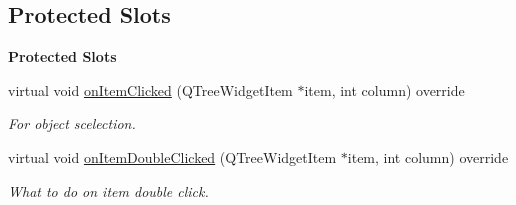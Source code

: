 \subsection*{Protected Slots}
\begin{Indent}\textbf{ Protected Slots}\par
\begin{DoxyCompactItemize}
\item 
\mbox{\label{classrev_1_1_view_1_1_animation_tree_widget_a55c28cf1a2b9fba691f0dd83efe8cff7}} 
virtual void \mbox{\hyperlink{classrev_1_1_view_1_1_animation_tree_widget_a55c28cf1a2b9fba691f0dd83efe8cff7}{on\+Item\+Clicked}} (Q\+Tree\+Widget\+Item $\ast$item, int column) override
\begin{DoxyCompactList}\small\item\em For object scelection. \end{DoxyCompactList}\item 
\mbox{\label{classrev_1_1_view_1_1_animation_tree_widget_aaf0057e97ba1f8fa465fd1020a5be271}} 
virtual void \mbox{\hyperlink{classrev_1_1_view_1_1_animation_tree_widget_aaf0057e97ba1f8fa465fd1020a5be271}{on\+Item\+Double\+Clicked}} (Q\+Tree\+Widget\+Item $\ast$item, int column) override
\begin{DoxyCompactList}\small\item\em What to do on item double click. \end{DoxyCompactList}\end{DoxyCompactItemize}
\end{Indent}
